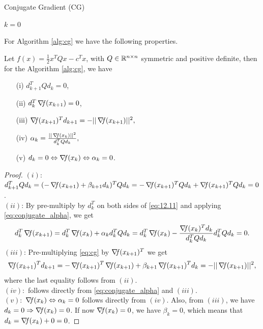 \documentclass[10pt,a4paper]{article}
\begin{document}
\begin{algorithm}[H]\label{alg:cg}
	\caption{Conjugate Gradient (CG)}
	
	
	$k = 0$
	
\end{algorithm}


\noindent For Algorithm \ref{alg:cg} we have the following properties.
\begin{lemma}\label{lemma:cg}
	Let $f(x) =\frac{1}{2}x^TQx -c^Tx$, with $Q\in \mathbb{R}^{n\times n}$ symmetric and positive definite, then for the Algorithm \ref{alg:cg}, we have 
	\begin{enumerate}
		\item[(i)] $d_{k+1}^TQd_k =0$,
		\item[(ii)] $d_k^T\operatorname*{\mathit{\nabla \!f}}(x_{k+1})=0$,
		\item[(iii)]$\operatorname*{\mathit{\nabla \!f}}(x_{k+1})^Td_{k+1} = -||\operatorname*{\mathit{\nabla \!f}}(x_{k+1})||^2,$
		\item[(iv)] $\alpha_k = \frac{||\operatorname*{\mathit{\nabla \!f}} (x_k)||^2}{d_k^T Q d_k},$
		\item[(v)] $d_k = 0 \Leftrightarrow \operatorname*{\mathit{\nabla \!f}}(x_k)\Leftrightarrow \alpha_k=0$.
	\end{enumerate}
\end{lemma}
\begin{proof}
	$(i)$: $d_{k+1}^TQd_k = (-\operatorname*{\mathit{\nabla \!f}}(x_{k+1}) +\beta_{k+1} d_k)^T Qd_k = -\operatorname*{\mathit{\nabla \!f}}(x_{k+1})^TQd_k + \operatorname*{\mathit{\nabla \!f}}(x_{k+1})^TQd_k = 0$. \\
	$(ii)$: By pre-multiply by $d_k^T$ on both sides of \eqref{eq:12.11} and applying \eqref{eq:conjugate_alpha}, we get 
$$d_k^T\operatorname*{\mathit{\nabla \!f}}(x_{k+1}) = d_k^T\operatorname*{\mathit{\nabla \!f}}(x_k) + \alpha_k d_k^TQ d_k = d_k^T\operatorname*{\mathit{\nabla \!f}}(x_k) -\frac{\operatorname*{\mathit{\nabla \!f}} (x_k)^T d_k}{d_k^T Q d_k} d_k^TQ d_k=0.$$
$(iii)$: Pre-multiplying \eqref{eq:cg} by $\operatorname*{\mathit{\nabla \!f}}(x_{k+1})^T$ we get
$$\operatorname*{\mathit{\nabla \!f}}(x_{k+1})^Td_{k+1} = -\operatorname*{\mathit{\nabla \!f}}(x_{k+1})^T\operatorname*{\mathit{\nabla \!f}}(x_{k+1}) +\beta_{k+1} \operatorname*{\mathit{\nabla \!f}}(x_{k+1})^Td_k=-||\operatorname*{\mathit{\nabla \!f}}(x_{k+1})||^2,$$
where the last equality follows from $(ii)$.\\
$(iv):$ follows directly from \eqref{eq:conjugate_alpha} and $(iii)$.\\
$(v):$ $\operatorname*{\mathit{\nabla \!f}}(x_k)\Leftrightarrow \alpha_k=0$ follows directly from $(iv)$. Also, from $(iii)$, we have $d_k=0\Rightarrow \operatorname*{\mathit{\nabla \!f}}(x_k)=0$. If now $\operatorname*{\mathit{\nabla \!f}}(x_k)=0$, we have $\beta_k = 0$, which means that $d_k=\operatorname*{\mathit{\nabla \!f}}(x_k)+ 0 =0$.
\end{proof} 
\end{document}
